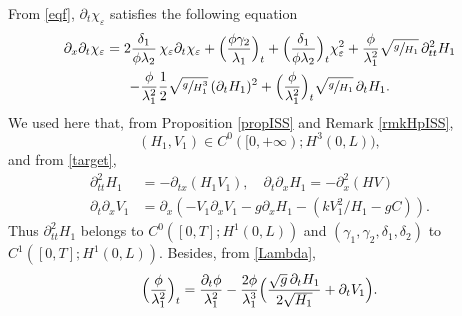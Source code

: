 \documentclass[JEP,XML,SOM,Unicode]{cedram}
\theoremstyle{definition}
\begin{document}
From \eqref{eqf},
$\partial_{t}\chi_{\varepsilon}$ satisfies the following equation
\begin{multline}
\label{eqdtf}
\partial_{x}\partial_{t}\chi_{\varepsilon}=2\frac{\delta_{1}}{\phi\lambda_{2}}\,\chi_{\varepsilon}\partial_{t}\chi_{\varepsilon}+\Bigl(\frac{\phi\gamma_{2}}{\lambda_{1}} \Bigr)_{t}+ \Bigl(\frac{\delta_{1}}{\phi\lambda_{2}} \Bigr)_{t}\chi^{2}_{\varepsilon}
+{\frac{\phi}{\lambda_{1}^{2}}}\sqrt{\sfrac{g}{H_{1}}}\,\partial_{tt}^{2} H_{1}\\
-{\frac{\phi}{\lambda_{1}^{2}}}\frac{1}{2}\sqrt{\sfrac{g}{H_{1}^{3}}}\,(\partial_{t}H_{1})^{2}+{\Bigl(\frac{\phi}{\lambda_{1}^{2}} \Bigr)_{t}\sqrt{\sfrac{g}{H_{1}}}\,\partial_{t} H_{1}}.
\end{multline}
We used here that, from Proposition \ref{propISS} and Remark \ref{rmkHpISS},
\[
(H_{1},V_{1})\in C^{0}([0,+\infty); H^{3}(0,L)),
\]
and from \eqref{target},
\begin{align*}
\partial_{tt}^{2}H_{1} &= -\partial_{tx}(H_{1}V_{1}), \quad\partial_{t}\partial_{x}H_{1}=-\partial_{x}^{2}(HV)\\
\tag*{and}
\partial_{t}\partial_{x}V_{1}&=\partial_{x}\left(-V_{1}\partial_{x}V_{1}-g\partial_{x}H_{1}-(kV_{1}^{2}/H_{1}-gC)\right).
\end{align*}
Thus $\partial_{tt}^{2}H_{1}$ belongs to $C^{0}([0,T]; H^{1}(0,L))$ and $(\gamma_{1}, \gamma_{2},\delta_{1},\delta_{2})$ to $C^{1}([0,T]; H^{1}(0,L))$. Besides, from \eqref{Lambda},
\begin{equation*}
\Bigl(\frac{\phi}{\lambda_{1}^{2}} \Bigr)_{t} = \frac{\partial_{t}\phi}{\lambda_{1}^{2}}-\frac{2\phi}{\lambda_{1}^{3}} \Bigl(\frac{{\sqrt{g}}\,\partial_{t}H_{1}}{2\sqrt{H_{1}}}+\partial_{t}V_{1} \Bigr).
\end{equation*}
\end{document}
